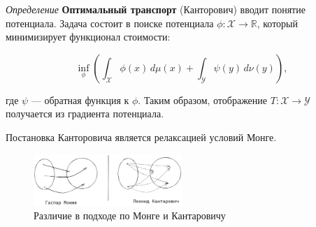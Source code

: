 \textit{Определение} \textbf{Оптимальный транспорт} (Канторович) вводит понятие потенциала.
 Задача состоит в поиске потенциала \( \phi: \mathcal{X} \rightarrow \mathbb{R} \), который минимизирует функционал стоимости:

$$
    \inf_{\phi} \left( \int_{\mathcal{X}} \phi(x) \, d\mu(x) + \int_{\mathcal{Y}} \psi(y) \, d\nu(y) \right),
$$

где \( \psi \) — обратная функция к \( \phi \). Таким образом, отображение \( T: \mathcal{X} \rightarrow \mathcal{Y} \) получается из градиента потенциала.

Постановка Канторовича является релаксацией условий Монге.

\begin{figure}[h]
    \centering
    \includegraphics[width=0.5\textwidth]{assets/ml/generation/optimal_transport.excalidraw.png}
    \caption{Различие в подходе по Монге и Кантаровичу}
    \label{opt_transport}
\end{figure}

